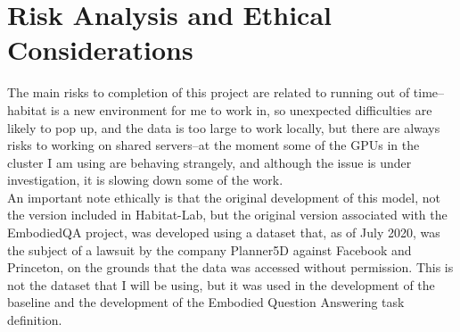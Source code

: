 \documentclass{article}
\begin{document}
\section{Risk Analysis and Ethical Considerations}
The main risks to completion of this project are related to running out of time--habitat is a new environment for me to work in, so unexpected difficulties are likely to pop up, and the data is too large to work locally, but there are always risks to working on shared servers--at the moment some of the GPUs in the cluster I am using are behaving strangely, and although the issue is under investigation, it is slowing down some of the work. \\
An important note ethically is that the original development of this model, not the version included in Habitat-Lab, but the original version associated with the EmbodiedQA project, was developed using a dataset that, as of July 2020, was the subject of a lawsuit by the company Planner5D against Facebook and Princeton, on the grounds that the data was accessed without permission\cite{planner5d}. This is not the dataset that I will be using, but it was used in the development of the baseline and the development of the Embodied Question Answering task definition. 




\end{document}
